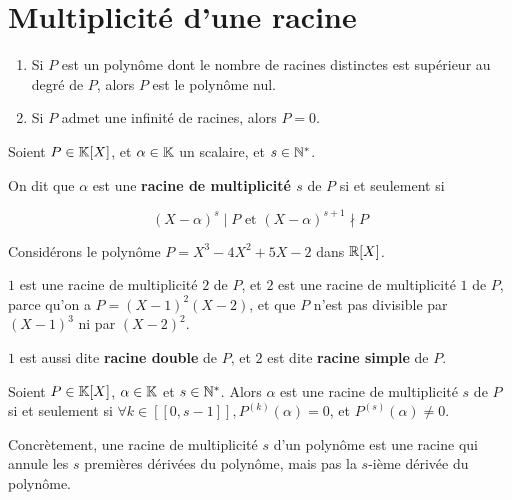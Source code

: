 \documentclass[12pt, a4paper]{report}
\begin{document}
\section{Multiplicité d'une racine}

\begin{remark}
    \begin{enumerate}
        \item Si $P$ est un polynôme dont le nombre de racines distinctes est supérieur au degré de $P$, alors $P$ est le polynôme nul. 
        \item Si $P$ admet une infinité de racines, alors $P=0$.
    \end{enumerate}
\end{remark}

\begin{definition}
    Soient $P \in \mathbb{K}[X]$, et $\alpha \in \mathbb{K}$ un scalaire, et $s\in \mathbb{N}^*$.

    On dit que $\alpha$ est une \textbf{racine de multiplicité $s$} de $P$ si et seulement si
    
    $$(X-\alpha)^s \mid P \text{ et } (X-\alpha)^{s+1} \nmid P$$
\end{definition}

\begin{example}
    Considérons le polynôme $P = X^3 - 4X^2 + 5X - 2$ dans $\mathbb{R}[X]$.

    $1$ est une racine de multiplicité $2$ de $P$, et $2$ est une racine de multiplicité $1$ de $P$, parce qu'on a $P = (X-1)^2(X-2)$, et que $P$ n'est pas divisible par $(X-1)^3$ ni par $(X-2)^2$.

    $1$ est aussi dite \textbf{racine double} de $P$, et $2$ est dite \textbf{racine simple} de $P$.
\end{example}

\begin{property}
    Soient $P \in \mathbb{K}[X]$, $\alpha \in \mathbb{K}$ et $s\in \mathbb{N}^*$. Alors $\alpha$ est une racine de multiplicité $s$ de $P$ si et seulement si $\forall k \in [\![0,s-1]\!], P^{(k)}(\alpha) = 0$, et $P^{(s)}(\alpha) \ne 0$.

    Concrètement, une racine de multiplicité $s$ d'un polynôme est une racine qui annule les $s$ premières dérivées du polynôme, mais pas la $s$-ième dérivée du polynôme.
\end{property}
\end{document}
